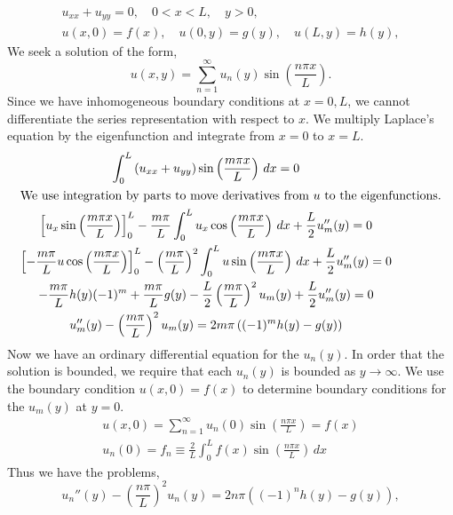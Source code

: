 {%
\begin{Solution}
  \begin{gather*}
    u_{x x} + u_{y y} = 0, \quad 0 < x < L, \quad y > 0, \\
    u(x, 0) = f(x), \quad u(0, y) = g(y), \quad u(L, y) = h(y),
  \end{gather*}
  We seek a solution of the form,
  \[
  u(x, y) = \sum_{n = 1}^\infty u_n(y) \sin \left( \frac{n \pi x}{L} \right).
  \]
  Since we have inhomogeneous boundary conditions at $x = 0, L$, we cannot
  differentiate the series representation with respect to $x$.
  We multiply Laplace's equation by the eigenfunction and integrate from
  $x = 0$ to $x = L$.
  \begin{gather*}
    \int_0^L \left( u_{x x} + u_{y y} \right) \sin \left( \frac{m \pi x}{L} \right)
    \, d x = 0 \\
    \intertext{We use integration by parts to move derivatives from $u$ to 
      the eigenfunctions.}
    \left[ u_x \sin \left( \frac{m \pi x}{L} \right) \right]_0^L
    - \frac{m \pi}{L} \int_0^L u_x \cos \left( \frac{m \pi x}{L} \right)
    \,d x + \frac{L}{2} u_m''(y) = 0 \\
    \left[ - \frac{m \pi}{L} u \cos\left( \frac{m \pi x}{L} \right) \right]_0^L
    - \left( \frac{m \pi}{L} \right)^2 \int_0^L u 
    \sin \left( \frac{m \pi x}{L} \right) \,d x
    + \frac{L}{2} u_m''(y) = 0 \\
    - \frac{m \pi}{L} h(y) (-1)^m + \frac{m \pi}{L} g(y) 
    - \frac{L}{2} \left( \frac{m \pi}{L} \right)^2 u_m(y)
    + \frac{L}{2} u_m''(y) = 0 \\
    u_m''(y) - \left( \frac{m \pi}{L} \right)^2 u_m(y) = 2 m \pi
    \left( (-1)^m h(y) - g(y) \right)
  \end{gather*}
  Now we have an ordinary differential equation for the $u_n(y)$.  In order 
  that the solution is bounded, we require that each $u_n(y)$ is bounded as
  $y \to \infty$.  We use the boundary condition $u(x, 0) = f(x)$ to determine
  boundary conditions for the $u_m(y)$ at $y = 0$.
  \begin{gather*}
    u(x, 0) = \sum_{n = 1}^\infty u_n(0) \sin \left( \frac{n \pi x}{L} \right) = f(x) \\
    u_n(0) = f_n \equiv \frac{2}{L} \int_0^L f(x) 
    \sin \left( \frac{n \pi x}{L} \right) \,d x
  \end{gather*}
  Thus we have the problems,
  \[
  u_n''(y) - \left( \frac{n \pi}{L} \right)^2 u_n(y) = 2 n \pi
  \left( (-1)^n h(y) - g(y) \right), 
\]
\end{Solution}}
